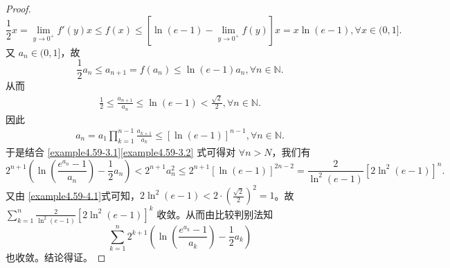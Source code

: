\documentclass[../../main.tex]{subfiles}%
\begin{document}
\begin{proof}
\[
\frac{1}{2} x = \lim_{y \to 0^+} f'(y) x \leqslant  f(x) \leqslant  [\ln(e - 1) - \lim_{y \to 0^+} f(y)] x = x \ln(e - 1),\forall x \in (0, 1].
\]
又 \(a_n \in (0, 1]\)，故
\[
\frac{1}{2} a_n \leqslant  a_{n + 1} = f(a_n) \leqslant  \ln(e - 1) a_n,\forall n \in \mathbb{N}.
\]
从而
\begin{align}
\frac{1}{2} \leqslant  \frac{a_{n + 1}}{a_n} \leqslant  \ln(e - 1) < \frac{\sqrt{2}}{2},\forall n \in \mathbb{N}. \label{example4.59-4.1} 
\end{align}
因此
\begin{align}
a_n = a_1 \prod_{k = 1}^{n - 1} \frac{a_{k + 1}}{a_k} \leqslant  [\ln(e - 1)]^{n - 1},\forall n \in \mathbb{N}. \label{example4.59-3.2}
\end{align}
于是结合 \eqref{example4.59-3.1}\eqref{example4.59-3.2} 式可得对 \(\forall n > N\)，我们有
\[
2^{n + 1}\left(\ln\left(\frac{e^{a_n} - 1}{a_n}\right) - \frac{1}{2} a_n\right) < 2^{n + 1} a_n^2 \leqslant  2^{n + 1}[\ln(e - 1)]^{2n - 2} = \frac{2}{\ln^2(e - 1)}[2\ln^2(e - 1)]^n.
\]
又由 \eqref{example4.59-4.1}式可知，\(2\ln^2(e - 1) < 2\cdot\left(\frac{\sqrt{2}}{2}\right)^2 = 1\)。故 \(\sum_{k = 1}^n \frac{2}{\ln^2(e - 1)}[2\ln^2(e - 1)]^k\) 收敛。从而由比较判别法知$$\sum_{k = 1}^n 2^{k + 1}\left(\ln\left(\frac{e^{a_k} - 1}{a_k}\right)- \frac{1}{2} a_k\right)$$也收敛。结论得证。
\end{proof}
\end{document}
